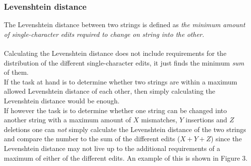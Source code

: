 \documentclass[12pt]{article}
\begin{document}
\subsubsection{Levenshtein distance}
The Levenshtein distance between two strings is defined as \textit{the minimum amount of single-character edits required
to change on string into the other.} ~\citeyear{leve} \\ \\
Calculating the Levenshtein distance does not include requirements for the distribution of the different 
single-character edits, it just finds the minimum \textit{sum} of them. \\
If the task at hand is to determine whether two strings are within a maximum allowed Levenshtein distance of each other,
then simply calculating the Levenshtein distance would be enough. \\
If however the task is to determine whether one string can be changed into another string with a maximum amount of $X$  mismatches, $Y$ insertions and $Z$ deletions one can \textit{not} simply calculate the Levenshtein distance of the two
strings and compare the number to the sum of the different edits ($X+Y+Z$) since the Levenshtein distance may not live
up to the additional requirements of a maximum of either of the different edits. An example of this is shown in Figure 3. \\
\end{document}
